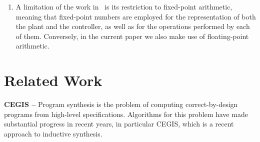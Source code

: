\begin{enumerate}
%


\item A limitation of the work in~\cite{DBLP:conf/cav/AbateBCCDKKP17} 
  is its restriction to fixed-point arithmetic, meaning that fixed-point
  numbers are employed for the representation of both the plant and the
  controller, as well as for the operations performed by each of them. 
  Conversely, in the current paper we also make use of floating-point
  arithmetic.  
  
\end{enumerate}
  
\section{Related Work}
\label{sec:relw}

\textbf{CEGIS --} Program synthesis is the problem of computing
correct-by-design programs from high-level specifications. Algorithms
for this problem have made substantial progress in recent years, in
particular CEGIS, which is a recent approach to inductive synthesis.

